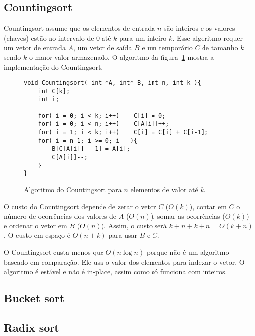 \subsection{Countingsort}

Countingsort assume que os elementos de entrada $n$ são inteiros e
os valores (chaves) estão no intervalo de $0$ até $k$ para um inteiro $k$.
Esse algoritmo requer um vetor de entrada $A$, um vetor de saída $B$ e um
temporário $C$ de tamanho $k$ sendo $k$ o maior valor armazenado.
O algoritmo da figura~\ref{aula03:algo:counting} mostra a implementação do
Countingsort.
%
\begin{figure}[!htb]
\centering
\begin{framed}
\begin{lstlisting}
void Countingsort( int *A, int* B, int n, int k ){
	int C[k];
	int i;

	for( i = 0; i < k; i++)    C[i] = 0;
	for( i = 0; i < n; i++)    C[A[i]]++;
	for( i = 1; i < k; i++)    C[i] = C[i] + C[i-1];
	for( i = n-1; i >= 0; i-- ){
		B[C[A[i]] - 1] = A[i];
		C[A[i]]--;
	}
}
\end{lstlisting}
\end{framed}
\caption{Algoritmo do Countingsort para $n$ elementos de valor até $k$.}
\label{aula03:algo:counting}
\end{figure}

O custo do Countingsort depende de zerar o vetor $C$ ($O(k)$), 
contar em $C$ o número de ocorrências dos valores de $A$ ($O(n)$),
somar as ocorrências ($O(k)$) e ordenar o vetor em $B$ ($O(n)$).
Assim, o custo será $k + n + k + n = O(k + n)$.
O custo em espaço é $O(n + k)$ para usar $B$ e $C$.

O Countingsort custa menos que $O(n \log n)$ porque não é um algoritmo baseado
em comparação.  Ele usa o valor dos elementos para indexar o vetor.
O algoritmo é estável e não é in-place, assim como só funciona com inteiros.

\subsection{Bucket sort}

\subsection{Radix sort}

